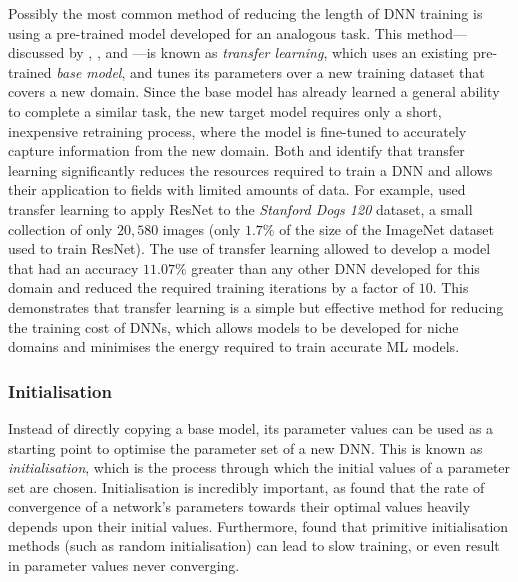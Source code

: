 \documentclass[a4paper, 11pt]{report}
\begin{document}
    Possibly the most common method of reducing the length of DNN training is using a pre-trained model developed for an analogous task. This method---discussed by \citet{strubell-2019}, \citet{walsh-2021}, and \citet{schwartz-2019}---is known as \emph{transfer learning}, which uses an existing pre-trained \emph{base model}, and tunes its parameters over a new training dataset that covers a new domain. Since the base model has already learned a general ability to complete a similar task, the new target model requires only a short, inexpensive retraining process, where the model is fine-tuned to accurately capture information from the new domain. Both \citet{strubell-2019} and \citet{walsh-2021} identify that transfer learning significantly reduces the resources required to train a DNN and allows their application to fields with limited amounts of data. For example, \citet{wang-2020} used transfer learning to apply ResNet to the \emph{Stanford Dogs 120} dataset, a small collection of only $20,580$ images (only $1.7\%$ of the size of the ImageNet dataset used to train ResNet). The use of transfer learning allowed \citeauthor{wang-2020} to develop a model that had an accuracy $11.07\%$ greater than any other DNN developed for this domain and reduced the required training iterations by a factor of $10$. This demonstrates that transfer learning is a simple but effective method for reducing the training cost of DNNs, which allows models to be developed for niche domains and minimises the energy required to train accurate ML models.


    \subsubsection{Initialisation}

    Instead of directly copying a base model, its parameter values can be used as a starting point to optimise the parameter set of a new DNN. This is known as \emph{initialisation}, which is the process through which the initial values of a parameter set are chosen. Initialisation is incredibly important, as \citet{xu-2021} found that the rate of convergence of a network's parameters towards their optimal values heavily depends upon their initial values. Furthermore, \citet{hanin-2018} found that primitive initialisation methods (such as random initialisation) can lead to slow training, or even result in parameter values never converging.
\end{document}
